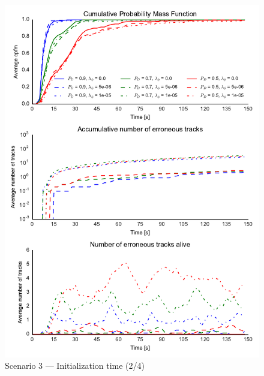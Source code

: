 \begin{figure}
\centering
\includegraphics{Figures/plots/Scenario3_Init-Time(2-4).pdf}
\caption{Scenario 3 --- Initialization time (2/4)}\label{fig:init3_time_2-4}
\end{figure}

